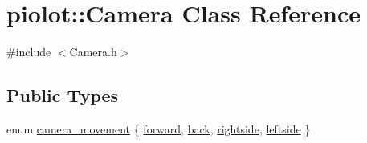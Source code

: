 \hypertarget{classpiolot_1_1_camera}{}\section{piolot\+:\+:Camera Class Reference}
\label{classpiolot_1_1_camera}


{\ttfamily \#include $<$Camera.\+h$>$}

\subsection*{Public Types}
\begin{DoxyCompactItemize}
\item 
enum \mbox{\hyperlink{classpiolot_1_1_camera_afba5e0e4539ee7666e8354842c4988e0}{camera\+\_\+movement}} \{ \mbox{\hyperlink{classpiolot_1_1_camera_afba5e0e4539ee7666e8354842c4988e0a0cb80fe1877fddc4afdeb7bb00785842}{forward}}, 
\mbox{\hyperlink{classpiolot_1_1_camera_afba5e0e4539ee7666e8354842c4988e0a54badf21a866512cc17c36e2cf1b4aa6}{back}}, 
\mbox{\hyperlink{classpiolot_1_1_camera_afba5e0e4539ee7666e8354842c4988e0a4f24534e1ab495cce0a63f8e28fda1b9}{rightside}}, 
\mbox{\hyperlink{classpiolot_1_1_camera_afba5e0e4539ee7666e8354842c4988e0a25379d6baed208220bc99d359283c5e8}{leftside}}
 \}
\end{DoxyCompactItemize}

